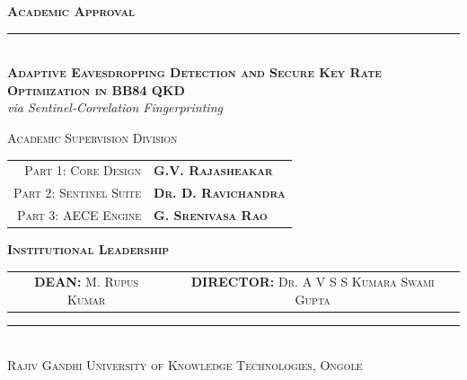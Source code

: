 \documentclass[journal,onecolumn,12pt,draftclsnofoot]{IEEEtran}
\begin{document}
\newpage
\begin{titlepage}
\centering
\thispagestyle{empty}

\vspace*{0.8cm}
{\huge \textbf{\textsc{Academic Approval}}}\\[1cm]
\rule{0.6\linewidth}{1pt}\\[1cm]

{\Large \textbf{\textsc{Adaptive Eavesdropping Detection and Secure Key Rate Optimization in BB84 QKD}}}\\[0.2cm]
{\large \textit{via Sentinel-Correlation Fingerprinting}}\\[1.5cm]

\vfill

{\large \textsc{Academic Supervision Division}}\\[0.8cm]
\begin{center}
\setlength{\tabcolsep}{28pt}
\begin{tabular}{rl}
    \textsc{Part 1: Core Design} & \textbf{\textsc{G.V. Rajasheakar}} \\
    \textsc{Part 2: Sentinel Suite} & \textbf{\textsc{Dr. D. Ravichandra}} \\
    \textsc{Part 3: AECE Engine} & \textbf{\textsc{G. Srenivasa Rao}} \\
\end{tabular}
\end{center}

\vfill

{\large \textbf{\textsc{Institutional Leadership}}}\\[0.8cm]
\begin{center}
\setlength{\tabcolsep}{24pt}
\begin{tabular}{c c}
    \textbf{DEAN:} \textsc{M. Rupus Kumar} & \textbf{DIRECTOR:} \textsc{Dr. A V S S Kumara Swami Gupta}
\end{tabular}
\end{center}

\vfill
\rule{0.4\linewidth}{0.5pt}\\[0.3cm]
{\large \textsc{Rajiv Gandhi University of Knowledge Technologies, Ongole}}
\end{titlepage}

\newpage

\end{document}
